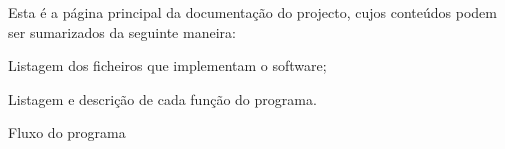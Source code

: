 Esta é a página principal da documentação do projecto, cujos conteúdos podem ser sumarizados da seguinte maneira\+:


\begin{DoxyEnumerate}
\item Listagem dos ficheiros que implementam o software;
\item Listagem e descrição de cada função do programa.
\item Fluxo do programa 
\end{DoxyEnumerate}
